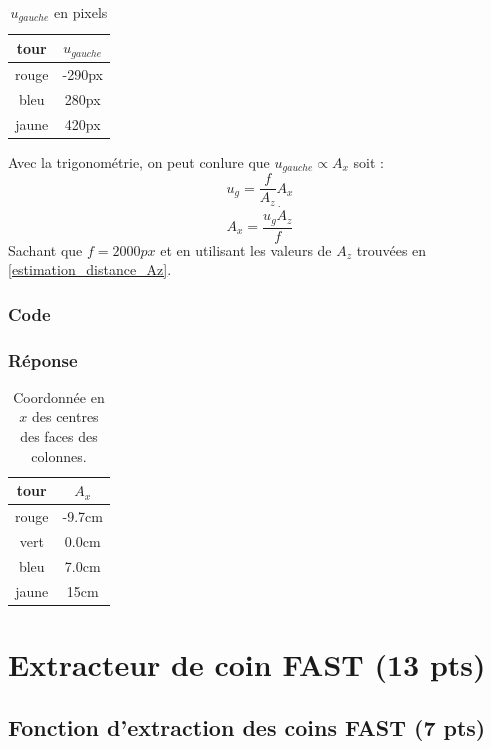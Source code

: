 \documentclass[12pt]{article}
\begin{document}
\begin{table}[h]
    \caption{$u_{gauche}$ en pixels}
\label{TableCoord}
\begin{center}
\begin{tabular}{|c|c|}
\hline
    tour   &  $u_{gauche}$\\
\hline
    rouge  & -290px  \\
    bleu   & 280px   \\
    jaune  & 420px   \\
\hline
\end{tabular}
\end{center}
\end{table}

Avec la trigonométrie, on peut conlure que $u_{gauche} \propto A_x$ soit :
\[ u_g = \frac{f}{A_z}A_x\]
\[ A_x = \frac{u_g \dot A_z}{f} \]
Sachant que $f = 2000px$ et en utilisant les valeurs de $A_z$ trouvées en \ref{estimation_distance_Az}.

\subsubsection{Code}
\subsubsection{Réponse}

\begin{table}[h]
\caption{Coordonnée en $x$ des centres des faces des colonnes.}
\label{TableX}
\begin{center}
\begin{tabular}{|c|c|}
\hline
 tour   &  $A_x$ \\
\hline
 rouge  &  -9.7cm     \\
 vert   &  0.0cm   \\
 bleu   &  7.0cm    \\
 jaune  &  15cm     \\
\hline
\end{tabular}
\end{center}
\end{table}


\newpage
\section{Extracteur de coin FAST (13 pts)}
 \label{SectionFAST}

\subsection{Fonction d'extraction des coins FAST (7 pts)}
\end{document}
